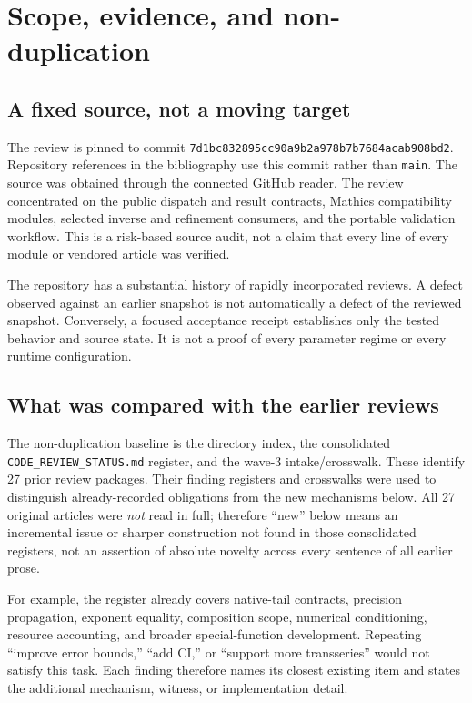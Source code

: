 \documentclass[11pt,letterpaper]{article}
\newcommand{\code}[1]{\nolinkurl{#1}}
\begin{document}
\section{Scope, evidence, and non-duplication}
\label{sec:scope}

\subsection{A fixed source, not a moving target}
The review is pinned to commit \code{7d1bc832895cc90a9b2a978b7b7684acab908bd2}.
Repository references in the bibliography use this commit rather than
\code{main}. The source was obtained through the connected GitHub reader.
The review concentrated on the public dispatch and result contracts,
Mathics compatibility modules, selected inverse and refinement consumers,
and the portable validation workflow. This is a risk-based source audit,
not a claim that every line of every module or vendored article was verified.
\cite{repo-core,repo-native,repo-mathics}

The repository has a substantial history of rapidly incorporated reviews.
A defect observed against an earlier snapshot is not automatically a defect
of the reviewed snapshot. Conversely, a focused acceptance receipt establishes
only the tested behavior and source state. It is not a proof of every parameter
regime or every runtime configuration.
\cite{review-status,review-wave3}

\subsection{What was compared with the earlier reviews}
The non-duplication baseline is the directory index, the consolidated
\code{CODE_REVIEW_STATUS.md} register, and the wave-3 intake/crosswalk.
These identify 27 prior review packages. Their finding registers and
crosswalks were used to distinguish already-recorded obligations from the
new mechanisms below. All 27 original articles were \emph{not} read in full;
therefore ``new'' below means an incremental issue or sharper construction
not found in those consolidated registers, not an assertion of absolute
novelty across every sentence of all earlier prose.
\cite{review-index,review-status,review-wave3}

For example, the register already covers native-tail contracts, precision
propagation, exponent equality, composition scope, numerical conditioning,
resource accounting, and broader special-function development. Repeating
``improve error bounds,'' ``add CI,'' or ``support more transseries'' would
not satisfy this task. Each finding therefore names its closest existing
item and states the additional mechanism, witness, or implementation detail.
\end{document}
